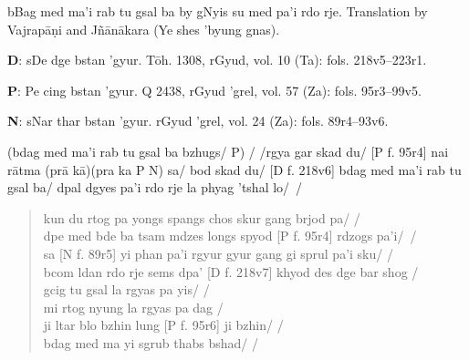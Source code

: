 \documentclass[naipra.tex]{subfiles}
\begin{document}
\noindent bBag med ma'i rab tu gsal ba by gNyis su med pa'i rdo rje. Translation by Vajrapāṇi and Jñānākara (Ye shes ’byung gnas). 

\medskip\noindent \textbf{D}: sDe dge bstan ’gyur. Tōh. 1308, rGyud, vol. 10 (Ta): fols. 218v5–223r1.

\medskip\noindent \textbf{P}: Pe cing bstan 'gyur. Q 2438, rGyud 'grel, vol. 57 (Za): fols. 95r3–99v5.

\medskip\noindent \textbf{N}: sNar thar bstan 'gyur. rGyud 'grel, vol. 24 (Za): fols. 89r4–93v6. 

\bigskip\noindent [D f. 218v5] [P f. 95r3] [N f. 89r4] (bdag med ma'i rab tu gsal ba bzhugs/ P) / /rgya gar skad du/ [P f. 95r4] nai rātma (prā kā)(pra ka P N) sa/ bod skad du/ [D f. 218v6] bdag med ma'i rab tu gsal ba/ dpal dgyes pa'i rdo rje la phyag 'tshal lo/~/

\begin{quote}
	kun du rtog pa yongs spangs chos skur gang brjod pa/ /\\
	dpe med bde ba tsam mdzes longs spyod [P f. 95r4] rdzogs pa'i/~/\\
	sa [N f. 89r5] yi phan pa'i rgyur gyur gang gi sprul pa'i sku/ \mbox{/}\\
	bcom ldan rdo rje sems dpa' [D f. 218v7] khyod des dge bar shog /\\

	gcig tu gsal la rgyas pa yis/ /\\
	mi rtog nyung la rgyas pa dag /\\
	ji ltar blo bzhin lung [P f. 95r6] ji bzhin/ /\\
	bdag med ma yi sgrub thabs bshad/ /
\end{quote}
\end{document}
